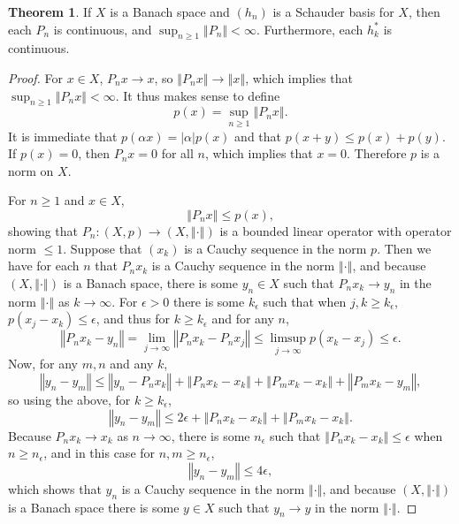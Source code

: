 \documentclass{article}
\newcommand{\norm}[1]{\left\Vert #1 \right\Vert}
\theoremstyle{definition}
\newtheorem{theorem}{Theorem}
\theoremstyle{definition}
\begin{document}
\begin{theorem}
If $X$ is a Banach space and $(h_n)$ is a Schauder basis for $X$, then each $P_n$ is continuous, and 
$\sup_{n \geq 1} \norm{P_n}<\infty$.  Furthermore, each $h_k^*$ is continuous.
\label{projections}
\end{theorem}
\begin{proof}
For $x \in X$, $P_n x \to x$, so $\norm{P_n x} \to \norm{x}$, which implies that $\sup_{n \geq 1} \norm{P_n x}<\infty$.
It thus makes sense to define
\[
p(x) = \sup_{n \geq 1} \norm{P_n x}.
\]
It is immediate that $p(\alpha x) = |\alpha| p(x)$ and that $p(x+y) \leq p(x) + p(y)$. If $p(x)=0$, then $P_nx=0$ for all $n$, 
which implies that $x=0$. Therefore $p$ is a norm on $X$. 

For $n \geq 1$ and $x \in X$,
\[
\norm{P_n x} \leq
p(x),
\]
showing that $P_n:(X,p) \to (X,\norm{\cdot})$ is a bounded linear operator with operator norm $\leq 1$. 
Suppose that $(x_k)$ is a Cauchy sequence in the norm $p$. Then we have for each $n$  that 
$P_n x_k$ is a Cauchy sequence in the norm
$\norm{\cdot}$, and because $(X,\norm{\cdot})$ is a Banach space, there is some
$y_n \in X$ such that $P_n x_k \to y_n$ in the norm $\norm{\cdot}$ as $k \to \infty$. 
For $\epsilon>0$ there is some $k_\epsilon$ such that when
$j,k \geq k_\epsilon$, $p(x_j-x_k) \leq \epsilon$, and thus for
$k \geq k_\epsilon$ and for any $n$,
\begin{equation}
\norm{P_n x_k-y_n} =  \lim_{j \to \infty} \norm{P_n x_k-P_n x_j}
\leq \limsup_{j \to \infty} p(x_k-x_j)
\leq \epsilon.
\label{Pnxk}
\end{equation}
Now, for any $m,n$ and any $k$,
\[
\norm{y_n-y_m} \leq \norm{y_n - P_n x_k}
+\norm{P_n x_k-x_k}+ \norm{P_m x_k-x_k} + \norm{P_m x_k- y_m},
\]
so using the above, for $k \geq k_\epsilon$, 
\[
\norm{y_n-y_m}  \leq 2\epsilon+\norm{P_n x_k-x_k}+ \norm{P_m x_k-x_k}.
\]
Because $P_n x_k \to x_k$ as $n \to \infty$, there is some  $n_\epsilon$ such that
$\norm{P_n x_k-x_k} \leq \epsilon$ when $n \geq n_\epsilon$, and in this case
for $n,m \geq n_\epsilon$,
\[
\norm{y_n-y_m}  \leq 4\epsilon,
\]
which shows that $y_n$ is a Cauchy sequence in the norm $\norm{\cdot}$, and because
$(X,\norm{\cdot})$ is a Banach space there is some $y \in X$ such that
$y_n \to y$ in the norm $\norm{\cdot}$. 


\end{proof}
\end{document}
